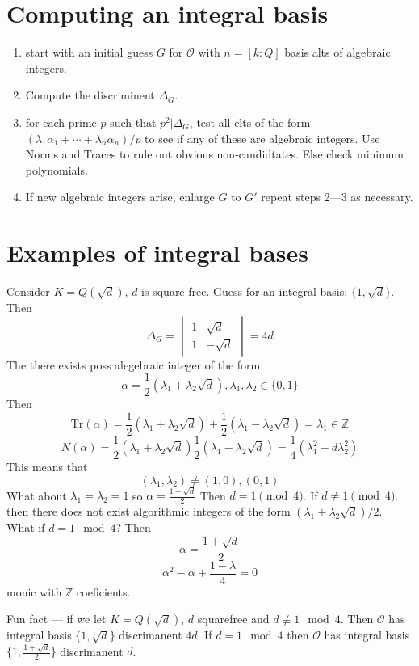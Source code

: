 \documentclass{article}
\begin{document}
\section{Computing an integral basis}
\begin{enumerate}
\item start with an initial guess $G$ for $\mathcal{O}$ with $n = [k:Q]$ basis alts
of algebraic integers. 

\item Compute the discriminent $\Delta_G$.
\item for each prime $p$ such that $p^2 | \Delta_G$, test all elts of the form
$(\lambda_1 \alpha_1 + \cdots + \lambda_n \alpha_n) / p$ to see if any of these
are algebraic integers. Use Norms and Traces to rule out obvious
non-candidtates. Else check minimum polynomials.

\item If new algebraic integers arise, enlarge $G$ to $G'$ repeat steps 2---3 as
necessary. 
\end{enumerate}

\section{Examples of integral bases}
Consider $K = Q(\sqrt{d})$, $d$ is square free.
Guess for an integral basis: $\{1, \sqrt{d}\}$. Then 
\[ \Delta_G = \begin{vmatrix} 1 & \sqrt{d} \\ 1 & -\sqrt{d} \end{vmatrix} = 4d
\]
The there exists poss alegebraic integer of the form
\[ \alpha = \frac{1}{2}(\lambda_1 + \lambda_2 \sqrt{d}), \lambda_1,\lambda_2 \in
\{0,1\} \]
Then
\[ \text{Tr}(\alpha) = \frac{1}{2} (\lambda_1 + \lambda_2 \sqrt{d}) +
\frac{1}{2}(\lambda_1 - \lambda_2\sqrt{d}) = \lambda_1 \in \mathbb{Z} \]
\[ N(\alpha) = \frac{1}{2}(\lambda_1 +
\lambda_2\sqrt{d})\frac{1}{2}(\lambda_1-\lambda_2 \sqrt{d}) =
\frac{1}{4}(\lambda_1^2 - d\lambda_2^2) \]
This means that 
\[ (\lambda_1,\lambda_2) \neq (1,0), (0,1) \]
What about $\lambda_1 = \lambda_2 = 1$ so $\alpha = \frac{1 + \sqrt{d}}{2}$ Then
$d = 1 \pmod 4$. If $d \neq 1 \pmod 4$. then there does not exist algorithmic
integers of the form $(\lambda_1+\lambda_2\sqrt{d})/2$. What if $d = 1 \mod 4$?
Then
\[ \alpha = \frac{1+\sqrt{d}}{2} \]
\[ \alpha^2 - \alpha + \frac{1-\lambda}{4} = 0 \]
monic with $\mathbb{Z}$ coeficients. 

Fun fact --- if we let $K=Q(\sqrt{d})$, $d$ squarefree and $d \not\equiv 1 \mod
4$. Then $\mathcal{O}$ has integral basis $\{1,\sqrt{d}\}$ discrimanent $4d$. If
$d = 1\mod 4$ then $\mathcal{O}$ has integral basis $\{1,
\frac{1+\sqrt{d}}{2}\}$ discrimanent $d$. 
\end{document}
